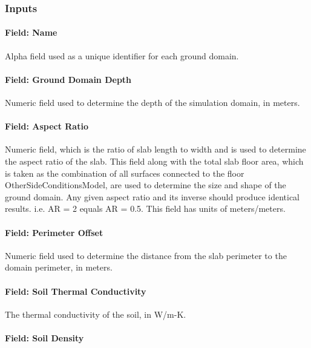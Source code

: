 \subsubsection{Inputs}\label{inputs-16-006}

\paragraph{Field: Name}\label{field-name-8-009}

Alpha field used as a unique identifier for each ground domain.

\paragraph{Field: Ground Domain Depth}\label{field-ground-domain-depth}

Numeric field used to determine the depth of the simulation domain, in meters.

\paragraph{Field: Aspect Ratio}\label{field-aspect-ratio}

Numeric field, which is the ratio of slab length to width and is used to determine the aspect ratio of the slab. This field along with the total slab floor area, which is taken as the combination of all surfaces connected to the floor OtherSideConditionsModel, are used to determine the size and shape of the ground domain. Any given aspect ratio and its inverse should produce identical results. i.e. AR = 2 equals AR = 0.5. This field has units of meters/meters.

\paragraph{Field: Perimeter Offset}\label{field-perimeter-offset}

Numeric field used to determine the distance from the slab perimeter to the domain perimeter, in meters.

\paragraph{Field: Soil Thermal Conductivity}\label{field-soil-thermal-conductivity-3}

The thermal conductivity of the soil, in W/m-K.

\paragraph{Field: Soil Density}\label{field-soil-density-3}

